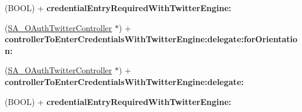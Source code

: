 \begin{DoxyCompactItemize}
\item 
\hypertarget{interface_s_a___o_auth_twitter_controller_a249eccafa1a9642701c551a56624fb73}{
(\-B\-O\-O\-L) + {\bfseries credential\-Entry\-Required\-With\-Twitter\-Engine\-:}}
\label{interface_s_a___o_auth_twitter_controller_a249eccafa1a9642701c551a56624fb73}

\item 
\hypertarget{interface_s_a___o_auth_twitter_controller_a80920decaf29b26add55d34c1f9789f7}{
(\hyperlink{interface_s_a___o_auth_twitter_controller}{\-S\-A\-\_\-\-O\-Auth\-Twitter\-Controller} $\ast$) + {\bfseries controller\-To\-Enter\-Credentials\-With\-Twitter\-Engine\-:delegate\-:for\-Orientation\-:}}
\label{interface_s_a___o_auth_twitter_controller_a80920decaf29b26add55d34c1f9789f7}

\item 
\hypertarget{interface_s_a___o_auth_twitter_controller_a4718f438f7767bcffedd1c485943c7b7}{
(\hyperlink{interface_s_a___o_auth_twitter_controller}{\-S\-A\-\_\-\-O\-Auth\-Twitter\-Controller} $\ast$) + {\bfseries controller\-To\-Enter\-Credentials\-With\-Twitter\-Engine\-:delegate\-:}}
\label{interface_s_a___o_auth_twitter_controller_a4718f438f7767bcffedd1c485943c7b7}

\item 
\hypertarget{interface_s_a___o_auth_twitter_controller_a249eccafa1a9642701c551a56624fb73}{
(\-B\-O\-O\-L) + {\bfseries credential\-Entry\-Required\-With\-Twitter\-Engine\-:}}
\label{interface_s_a___o_auth_twitter_controller_a249eccafa1a9642701c551a56624fb73}

\end{DoxyCompactItemize}
